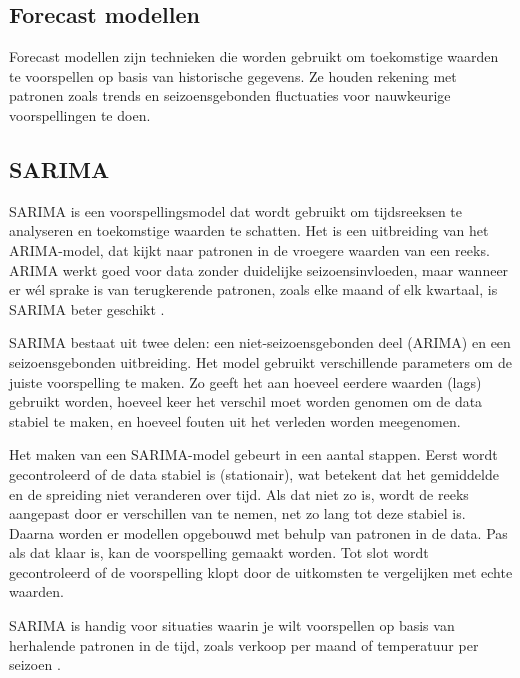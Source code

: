 \subsection{Forecast modellen}

Forecast modellen zijn technieken die worden gebruikt om toekomstige waarden te voorspellen op basis van historische gegevens. Ze houden rekening met patronen zoals trends en seizoensgebonden fluctuaties voor nauwkeurige voorspellingen te doen.

\subsection*{SARIMA}

SARIMA is een voorspellingsmodel dat wordt gebruikt om tijdsreeksen te analyseren en toekomstige waarden te schatten. Het is een uitbreiding van het ARIMA-model, dat kijkt naar patronen in de vroegere waarden van een reeks. ARIMA werkt goed voor data zonder duidelijke seizoensinvloeden, maar wanneer er wél sprake is van terugkerende patronen, zoals elke maand of elk kwartaal, is SARIMA beter geschikt \autocite{KumarDubey2021}.

\vspace{1em}

SARIMA bestaat uit twee delen: een niet-seizoensgebonden deel (ARIMA) en een seizoensgebonden uitbreiding. Het model gebruikt verschillende parameters om de juiste voorspelling te maken. Zo geeft het aan hoeveel eerdere waarden (lags) gebruikt worden, hoeveel keer het verschil moet worden genomen om de data stabiel te maken, en hoeveel fouten uit het verleden worden meegenomen.

\vspace{1em}

Het maken van een SARIMA-model gebeurt in een aantal stappen. Eerst wordt gecontroleerd of de data stabiel is (stationair), wat betekent dat het gemiddelde en de spreiding niet veranderen over tijd. Als dat niet zo is, wordt de reeks aangepast door er verschillen van te nemen, net zo lang tot deze stabiel is. Daarna worden er modellen opgebouwd met behulp van patronen in de data. Pas als dat klaar is, kan de voorspelling gemaakt worden. Tot slot wordt gecontroleerd of de voorspelling klopt door de uitkomsten te vergelijken met echte waarden.

\vspace{1em}

SARIMA is handig voor situaties waarin je wilt voorspellen op basis van herhalende patronen in de tijd, zoals verkoop per maand of temperatuur per seizoen \autocite{KumarDubey2021}.

